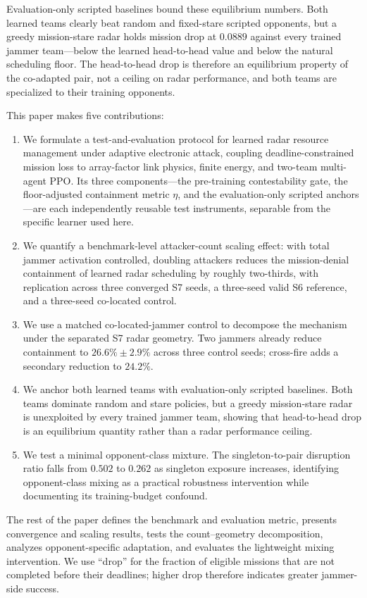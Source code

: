 Evaluation-only scripted baselines bound these equilibrium numbers. Both learned teams clearly beat random and fixed-stare scripted opponents, but a greedy mission-stare radar holds mission drop at $0.0889$ against every trained jammer team---below the learned head-to-head value and below the natural scheduling floor. The head-to-head drop is therefore an equilibrium property of the co-adapted pair, not a ceiling on radar performance, and both teams are specialized to their training opponents.

This paper makes five contributions:
\begin{enumerate}
    \item We formulate a test-and-evaluation protocol for learned radar resource management under adaptive electronic attack, coupling deadline-constrained mission loss to array-factor link physics, finite energy, and two-team multi-agent PPO. Its three components---the pre-training contestability gate, the floor-adjusted containment metric $\eta$, and the evaluation-only scripted anchors---are each independently reusable test instruments, separable from the specific learner used here.
    \item We quantify a benchmark-level attacker-count scaling effect: with total jammer activation controlled, doubling attackers reduces the mission-denial containment of learned radar scheduling by roughly two-thirds, with replication across three converged S7 seeds, a three-seed valid S6 reference, and a three-seed co-located control.
    \item We use a matched co-located-jammer control to decompose the mechanism under the separated S7 radar geometry. Two jammers already reduce containment to $26.6\%\pm2.9\%$ across three control seeds; cross-fire adds a secondary reduction to $24.2\%$.
    \item We anchor both learned teams with evaluation-only scripted baselines. Both teams dominate random and stare policies, but a greedy mission-stare radar is unexploited by every trained jammer team, showing that head-to-head drop is an equilibrium quantity rather than a radar performance ceiling.
    \item We test a minimal opponent-class mixture. The singleton-to-pair disruption ratio falls from $0.502$ to $0.262$ as singleton exposure increases, identifying opponent-class mixing as a practical robustness intervention while documenting its training-budget confound.
\end{enumerate}

The rest of the paper defines the benchmark and evaluation metric, presents convergence and scaling results, tests the count--geometry decomposition, analyzes opponent-specific adaptation, and evaluates the lightweight mixing intervention. We use ``drop'' for the fraction of eligible missions that are not completed before their deadlines; higher drop therefore indicates greater jammer-side success.
